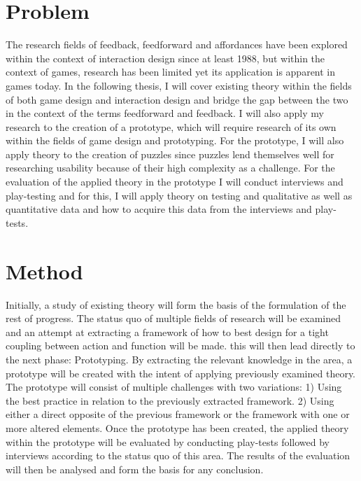 \section{Problem}
The research fields of feedback, feedforward and affordances have been explored within the context of interaction design since at least 1988, but within the context of games, research has been limited yet its application is apparent in games today. In the following thesis, I will cover existing theory within the fields of both game design and interaction design and bridge the gap between the two in the context of the terms feedforward and feedback. I will also apply my research to the creation of a prototype, which will require research of its own within the fields of game design and prototyping. For the prototype, I will also apply theory to the creation of puzzles since puzzles lend themselves well for researching usability because of their high complexity as a challenge. For the evaluation of the applied theory in the prototype I will conduct interviews and play-testing and for this, I will apply theory on testing and qualitative as well as quantitative data and how to acquire this data from the interviews and play-tests.

\section{Method}
Initially, a study of existing theory will form the basis of the formulation of the rest of progress. The status quo of multiple fields of research will be examined and an attempt at extracting a framework of how to best design for a tight coupling between action and function will be made. this will then lead directly to the next phase: Prototyping. By extracting the relevant knowledge in the area, a prototype will be created with the intent of applying previously examined theory. The prototype will consist of multiple challenges with two variations: 1) Using the best practice in relation to the previously extracted framework. 2) Using either a direct opposite of the previous framework or the framework with one or more altered elements. Once the prototype has been created, the applied theory within the prototype will be evaluated by conducting play-tests followed by interviews according to the status quo of this area. The results of the evaluation will then be analysed and form the basis for any conclusion.
